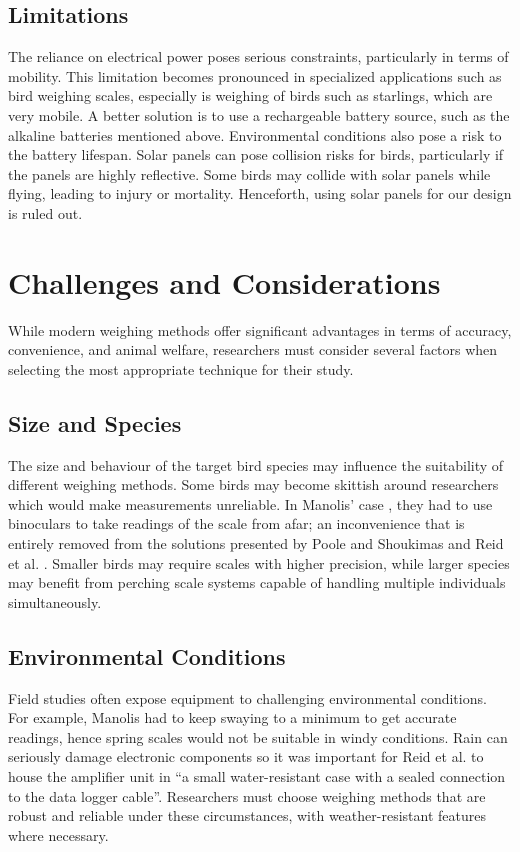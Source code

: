 \documentclass[class=report,11pt,crop=false]{standalone}
\begin{document}
\subsection{Limitations}
The reliance on electrical power poses serious constraints, particularly in terms of mobility. This limitation becomes pronounced in specialized applications such as bird weighing scales, especially is weighing of birds such as starlings, which are very mobile. A better solution is to use a rechargeable battery source, such as the alkaline batteries mentioned above. Environmental conditions also pose a risk to the battery lifespan. Solar panels can pose collision risks for birds, particularly if the panels are highly reflective. Some birds may collide with solar panels while flying, leading to injury or mortality. Henceforth, using solar panels for our design is ruled out. 

\section{Challenges and Considerations}
While modern weighing methods offer significant advantages in terms of accuracy, convenience, and animal welfare, researchers must consider several factors when selecting the most appropriate technique for their study.

\subsection{Size and Species}
The size and behaviour of the target bird species may influence the suitability of different weighing methods. Some birds may become skittish around researchers which would make measurements unreliable. In Manolis’ case \cite{manoils2024simple}, they had to use binoculars to take readings of the scale from afar; an inconvenience that is entirely removed from the solutions presented by Poole and Shoukimas \cite{poole1982scale} and Reid et al. \cite{reid1999measurement}. Smaller birds may require scales with higher precision, while larger species may benefit from perching scale systems capable of handling multiple individuals simultaneously.

\subsection{Environmental Conditions}
Field studies often expose equipment to challenging environmental conditions. For example, Manolis \cite{manoils2024simple} had to keep swaying to a minimum to get accurate readings, hence spring scales would not be suitable in windy conditions. Rain can seriously damage electronic components so it was important for Reid et al. \cite{reid1999measurement} to house the amplifier unit in “a small water-resistant case with a sealed connection to the data logger cable”. Researchers must choose weighing methods that are robust and reliable under these circumstances, with weather-resistant features where necessary.
\end{document}
